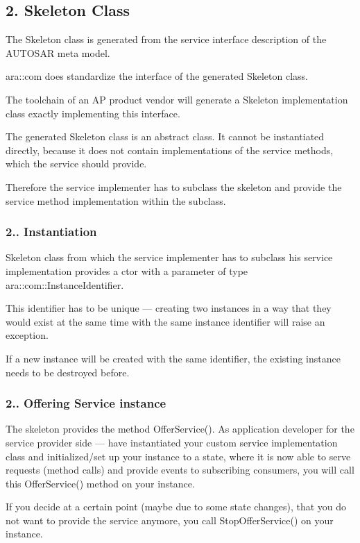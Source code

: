  \subsection*{2. Skeleton Class}


\begin{DoxyItemize}
\item The Skeleton class is generated from the service interface description of the A\+U\+T\+O\+S\+AR meta model.
\item ara\+::com does standardize the interface of the generated Skeleton class.
\item The toolchain of an AP product vendor will generate a Skeleton implementation class exactly implementing this interface.
\item The generated Skeleton class is an abstract class. It cannot be instantiated directly, because it does not contain implementations of the service methods, which the service should provide.
\item Therefore the service implementer has to subclass the skeleton and provide the service method implementation within the subclass. 
\end{DoxyItemize}

\subsubsection*{2.. Instantiation}


\begin{DoxyItemize}
\item Skeleton class from which the service implementer has to subclass his service implementation provides a ctor with a parameter of type ara\+::com\+::\+Instance\+Identifier.
\item This identifier has to be unique — creating two instances in a way that they would exist at the same time with the same instance identifier will raise an exception.
\item If a new instance will be created with the same identifier, the existing instance needs to be destroyed before.
\end{DoxyItemize}

\subsubsection*{2.. Offering Service instance}


\begin{DoxyItemize}
\item The skeleton provides the method Offer\+Service(). As application developer for the service provider side — have instantiated your custom service implementation class and initialized/set up your instance to a state, where it is now able to serve requests (method calls) and provide events to subscribing consumers, you will call this Offer\+Service() method on your instance.
\item If you decide at a certain point (maybe due to some state changes), that you do not want to provide the service anymore, you call Stop\+Offer\+Service() on your instance.
\end{DoxyItemize}

